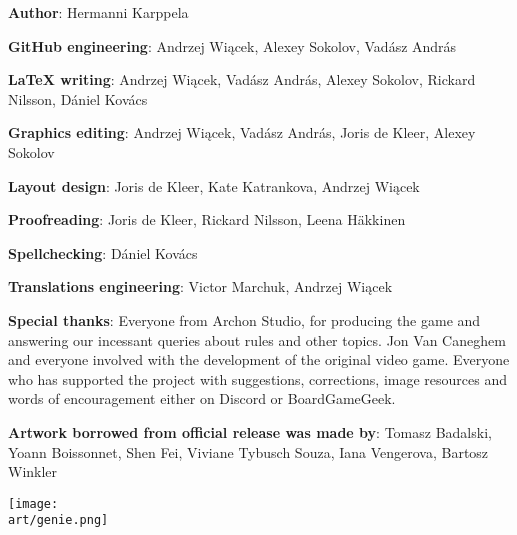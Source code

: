 
\restoregeometry


\bigbreak

\begin{multicols*}{2}

\textbf{Author}: Hermanni Karppela

\textbf{GitHub engineering}: Andrzej Wiącek, Alexey Sokolov, Vadász András

\textbf{LaTeX writing}: Andrzej Wiącek, Vadász András, Alexey Sokolov, Rickard Nilsson, Dániel Kovács

\textbf{Graphics editing}: Andrzej Wiącek, Vadász András, Joris de Kleer, Alexey Sokolov

\textbf{Layout design}: Joris de Kleer, Kate Katrankova, Andrzej Wiącek

\textbf{Proofreading}: Joris de Kleer, Rickard Nilsson, Leena Häkkinen

\textbf{Spellchecking}: Dániel Kovács

\textbf{Translations engineering}: Victor Marchuk, Andrzej Wiącek

\phantom{Translators placeholder}

\textbf{Special thanks}: Everyone from Archon Studio, for producing the game and answering our incessant queries about rules and other topics.
Jon Van Caneghem and everyone involved with the development of the original video game.
Everyone who has supported the project with suggestions, corrections, image resources and words of encouragement either on Discord or BoardGameGeek.

\textbf{Artwork borrowed from official release was made by}: Tomasz Badalski, Yoann Boissonnet, Shen Fei, Viviane Tybusch Souza, Iana Vengerova, Bartosz Winkler

\columnbreak

\vspace*{\fill}

\texttt{[image: \\art/genie.png]}

\vspace*{\fill}

\end{multicols*}
